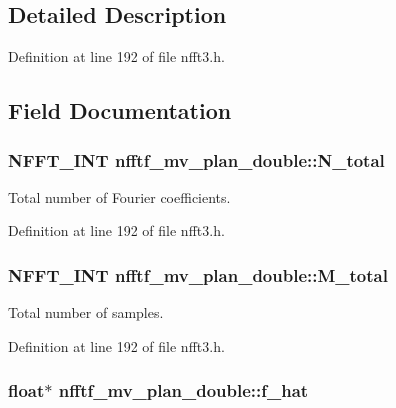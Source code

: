 \subsection{Detailed Description}


Definition at line 192 of file nfft3.\-h.



\subsection{Field Documentation}
\hypertarget{structnfftf__mv__plan__double_aecb1a9c6bbbb97f0b16111c62ac88389}{
\subsubsection[{N\-\_\-total}]{\setlength{\rightskip}{0pt plus 5cm}N\-F\-F\-T\-\_\-\-I\-N\-T nfftf\-\_\-mv\-\_\-plan\-\_\-double\-::\-N\-\_\-total}}\label{structnfftf__mv__plan__double_aecb1a9c6bbbb97f0b16111c62ac88389}


Total number of Fourier coefficients. 



Definition at line 192 of file nfft3.\-h.

\hypertarget{structnfftf__mv__plan__double_afd67e4d01f02df914834b0f3f04d2b3b}{
\subsubsection[{M\-\_\-total}]{\setlength{\rightskip}{0pt plus 5cm}N\-F\-F\-T\-\_\-\-I\-N\-T nfftf\-\_\-mv\-\_\-plan\-\_\-double\-::\-M\-\_\-total}}\label{structnfftf__mv__plan__double_afd67e4d01f02df914834b0f3f04d2b3b}


Total number of samples. 



Definition at line 192 of file nfft3.\-h.

\hypertarget{structnfftf__mv__plan__double_a109229f89032f01e4b2bece93297189c}{
\subsubsection[{f\-\_\-hat}]{\setlength{\rightskip}{0pt plus 5cm}float$\ast$ nfftf\-\_\-mv\-\_\-plan\-\_\-double\-::f\-\_\-hat}}\label{structnfftf__mv__plan__double_a109229f89032f01e4b2bece93297189c}


